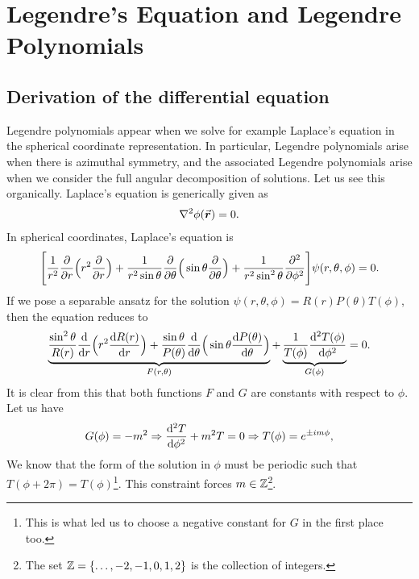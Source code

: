 \chapter{Legendre's Equation and Legendre Polynomials}


\section{Derivation of the differential equation}

Legendre polynomials appear when we solve for example Laplace's equation in the spherical coordinate representation.
In particular, Legendre polynomials arise when there is azimuthal symmetry, and the associated Legendre polynomials arise when we consider the full angular decomposition of solutions.
Let us see this organically.
Laplace's equation is generically given as
\begin{eqnarray}
    \laplacian \phi(\va*{r}) = 0
.\end{eqnarray}
In spherical coordinates, Laplace's equation is
\begin{eqnarray}
    \Bigg[ \frac{1}{r^2} \pdv{r} \Big( r^2 \pdv{r} \Big) + \frac{1}{r^2 \sin{\theta}} \pdv{\theta} \Big( \sin{\theta} \pdv{\theta} \Big) + \frac{1}{r^2 \sin^2{\theta}} \pdv[2]{\phi} \Bigg] \psi(r,\theta,\phi) = 0
.\end{eqnarray}
If we pose a separable ansatz for the solution $\psi(r,\theta,\phi) = R(r) P(\theta) T(\phi)$, then the equation reduces to
\begin{align}
    \underbrace{ \frac{\sin^2{\theta}}{ R(r)} \dv{r} \Big( r^2 \dv{R(r)}{r} \Big) + \frac{\sin{\theta}}{P(\theta)} \dv{\theta} \Big( \sin{\theta} \dv{P(\theta)}{\theta} \Big) }_{F(r,\theta)} + \underbrace{ \frac{1}{T(\phi)} \dv[2]{T(\phi)}{\phi} }_{G(\phi)} = 0
.\end{align}
It is clear from this that both functions $F$ and $G$ are constants with respect to $\phi$.
Let us have 
\begin{align}
    G(\phi) = -m^2 \Rightarrow \dv[2]{T}{\phi} + m^2 T = 0 \Rightarrow T(\phi) = e^{\pm im\phi}
,\end{align}
We know that the form of the solution in $\phi$ must be periodic such that $T(\phi + 2\pi) = T(\phi)$\footnote{This is what led us to choose a negative constant for $G$ in the first place too.}.
This constraint forces $m \in \mathbb{Z}$\footnote{The set $\mathbb{Z} = \{ \ldots,-2,-1,0,1,2 \}$ is the collection of integers.}.

